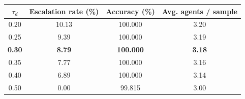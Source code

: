 \begin{tabular}{cccc}
\toprule
$\tau_d$ & Escalation rate (\%) & Accuracy (\%) & Avg. agents / sample \\
\midrule
0.20 & 10.13 & 100.000 & 3.20 \\
0.25 & 9.39 & 100.000 & 3.19 \\
\textbf{0.30} & \textbf{8.79} & \textbf{100.000} & \textbf{3.18} \\
0.35 & 7.77 & 100.000 & 3.16 \\
0.40 & 6.89 & 100.000 & 3.14 \\
0.50 & 0.00 & 99.815 & 3.00 \\
\bottomrule
\end{tabular}
